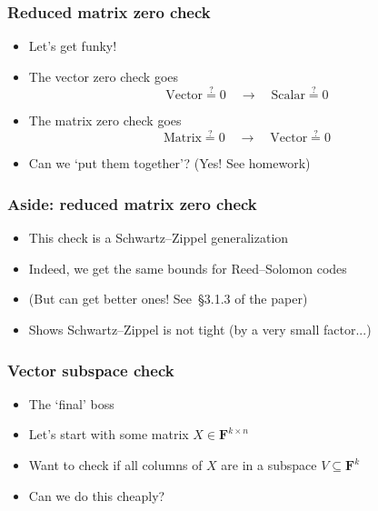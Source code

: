 \documentclass{beamer}
\newcommand{\field}{\mathbf{F}}
\begin{document}
    \begin{frame}
        \frametitle{Reduced matrix zero check}
        \begin{itemize}\itemsep=12pt
            \item Let's get funky!
            \pause
            \item The vector zero check goes
            \[
                \text{Vector}\stackrel{?}{=}0 \quad \to \quad \text{Scalar}\stackrel{?}{=}0
            \]
            \vspace{-2em}
            \pause
            \item The matrix zero check goes
            \[
                \text{Matrix}\stackrel{?}{=}0 \quad \to \quad \text{Vector}\stackrel{?}{=}0
            \]
            \vspace{-2em}
            \pause
            \item Can we `put them together'? \pause (Yes! See homework)
        \end{itemize}
    \end{frame}

    \begin{frame}
        \frametitle{Aside: reduced matrix zero check}
        \begin{itemize}\itemsep=12pt
            \item This check is a Schwartz--Zippel generalization
            \item Indeed, we get the same bounds for Reed--Solomon codes
            \item (But can get better ones! See~\S3.1.3 of the paper)
            \item Shows Schwartz--Zippel is not tight (by a very small factor...)
        \end{itemize}
    \end{frame}

    \begin{frame}
        \frametitle{Vector subspace check}
        \begin{itemize}\itemsep=12pt
            \item The `final' boss
            \pause
            \item Let's start with some matrix $X \in \field^{k \times n}$
            \item Want to check if all columns of $X$ are in a subspace $V \subseteq \field^k$
            \item Can we do this cheaply?
        \end{itemize}
    \end{frame}
\end{document}
